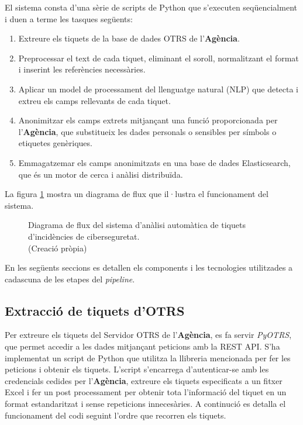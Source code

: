 El sistema consta d'una sèrie de scripts de Python que s'executen seqüencialment i duen a terme les tasques següents:

\begin{enumerate}
     \item Extreure els tiquets de la base de dades OTRS de l'\textbf{Agència}.
     \item Preprocessar el text de cada tiquet, eliminant el soroll, normalitzant el format i inserint les referències necessàries.
     \item Aplicar un model de processament del llenguatge natural (NLP) que detecta i extreu els camps rellevants de cada tiquet.
     \item Anonimitzar els camps extrets mitjançant una funció proporcionada per l'\textbf{Agència}, que substitueix les dades personals o sensibles per símbols o etiquetes genèriques.
     \item Emmagatzemar els camps anonimitzats en una base de dades Elasticsearch, que és un motor de cerca i anàlisi distribuïda.
\end{enumerate}

La figura \ref{fig:pipeline} mostra un diagrama de flux que il·lustra el funcionament del sistema.

\begin{figure}[H]
     \centering
     \vspace{1cm} %
     \setlength{\fboxsep}{5pt} %
     \setlength{\fboxrule}{0pt} %
     \caption{Diagrama de flux del sistema d'anàlisi automàtica de tiquets d'incidències de ciberseguretat. \\ (Creació pròpia)}
     \label{fig:pipeline}
\end{figure}

En les següents seccions es detallen els components i les tecnologies utilitzades a cadascuna de les etapes del \textit{pipeline}.
\subsection{Extracció de tiquets d'OTRS}
Per extreure els tiquets del Servidor OTRS de l'\textbf{Agència}, es fa servir \textit{PyOTRS}, que permet accedir a les dades mitjançant peticions amb la REST API. S'ha implementat un script de Python que utilitza la llibreria mencionada per fer les peticions i obtenir els tiquets. L'script s'encarrega d'autenticar-se amb les credencials cedides per l'\textbf{Agència}, extreure els tiquets especificats a un fitxer Excel i fer un post processament per obtenir tota l'informació del tiquet en un format estandaritzat i sense repeticions innecesàries. A continució es detalla el funcionament del codi seguint l'ordre que recorren els tiquets.

